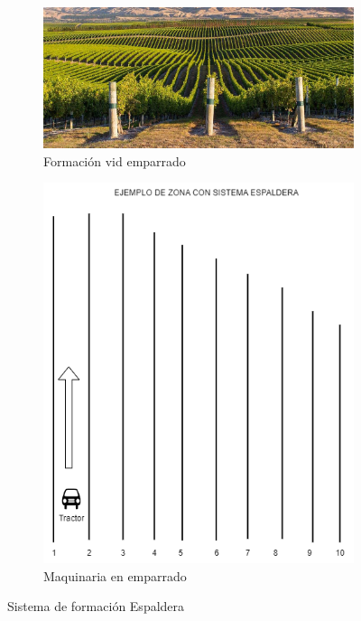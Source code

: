 \begin{figure}[hp!]
    \centering
    \begin{subfigure}[c]{0.75\textwidth}
      \includegraphics[width=\textwidth]{imaxes/3-Espalderas.png}
      \caption{Formación vid emparrado}
      \label{fig:espaldera}
    \end{subfigure}
    \hspace{0.1\textwidth}
    \begin{subfigure}[c]{0.65\textwidth}
      \includegraphics[width=\textwidth]{imaxes/4-EspalderasTractor.png}
      \caption{Maquinaria en emparrado}
      \label{fig:tractorEspaldera}
    \end{subfigure}
    \caption{Sistema de formación Espaldera}
    \label{fig:exemplo-subfiguras}
  \end{figure}


